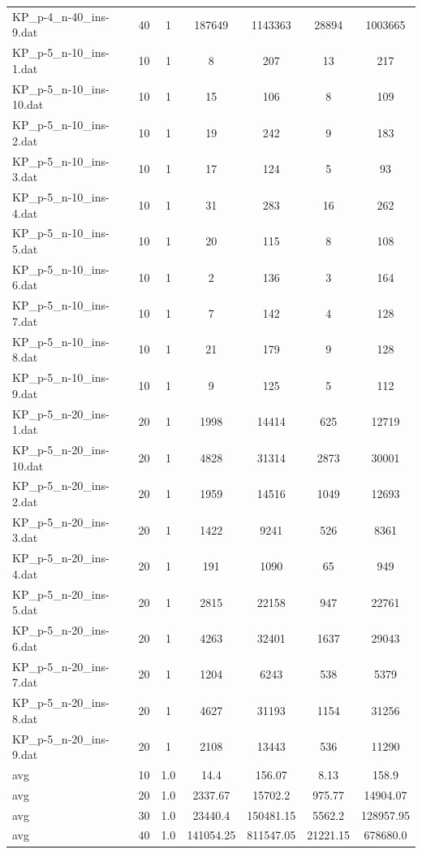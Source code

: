\begin{table}[!ht]
\begin{tabular}{lcccccc}
KP\_p-4\_n-40\_ins-9.dat & 40 & 1 & 187649 & 1143363 & 28894 & 1003665 \\
KP\_p-5\_n-10\_ins-1.dat & 10 & 1 & 8 & 207 & 13 & 217 \\
KP\_p-5\_n-10\_ins-10.dat & 10 & 1 & 15 & 106 & 8 & 109 \\
KP\_p-5\_n-10\_ins-2.dat & 10 & 1 & 19 & 242 & 9 & 183 \\
KP\_p-5\_n-10\_ins-3.dat & 10 & 1 & 17 & 124 & 5 & 93 \\
KP\_p-5\_n-10\_ins-4.dat & 10 & 1 & 31 & 283 & 16 & 262 \\
KP\_p-5\_n-10\_ins-5.dat & 10 & 1 & 20 & 115 & 8 & 108 \\
KP\_p-5\_n-10\_ins-6.dat & 10 & 1 & 2 & 136 & 3 & 164 \\
KP\_p-5\_n-10\_ins-7.dat & 10 & 1 & 7 & 142 & 4 & 128 \\
KP\_p-5\_n-10\_ins-8.dat & 10 & 1 & 21 & 179 & 9 & 128 \\
KP\_p-5\_n-10\_ins-9.dat & 10 & 1 & 9 & 125 & 5 & 112 \\
KP\_p-5\_n-20\_ins-1.dat & 20 & 1 & 1998 & 14414 & 625 & 12719 \\
KP\_p-5\_n-20\_ins-10.dat & 20 & 1 & 4828 & 31314 & 2873 & 30001 \\
KP\_p-5\_n-20\_ins-2.dat & 20 & 1 & 1959 & 14516 & 1049 & 12693 \\
KP\_p-5\_n-20\_ins-3.dat & 20 & 1 & 1422 & 9241 & 526 & 8361 \\
KP\_p-5\_n-20\_ins-4.dat & 20 & 1 & 191 & 1090 & 65 & 949 \\
KP\_p-5\_n-20\_ins-5.dat & 20 & 1 & 2815 & 22158 & 947 & 22761 \\
KP\_p-5\_n-20\_ins-6.dat & 20 & 1 & 4263 & 32401 & 1637 & 29043 \\
KP\_p-5\_n-20\_ins-7.dat & 20 & 1 & 1204 & 6243 & 538 & 5379 \\
KP\_p-5\_n-20\_ins-8.dat & 20 & 1 & 4627 & 31193 & 1154 & 31256 \\
KP\_p-5\_n-20\_ins-9.dat & 20 & 1 & 2108 & 13443 & 536 & 11290 \\
\hline avg & 10 & 1.0 &  14.4 & 156.07 &  8.13 & 158.9 \\ \hline
\hline avg & 20 & 1.0 &  2337.67 & 15702.2 &  975.77 & 14904.07 \\ \hline
\hline avg & 30 & 1.0 &  23440.4 & 150481.15 &  5562.2 & 128957.95 \\ \hline
\hline avg & 40 & 1.0 &  141054.25 & 811547.05 &  21221.15 & 678680.0 \\ \hline

\end{tabular}
\end{table}
